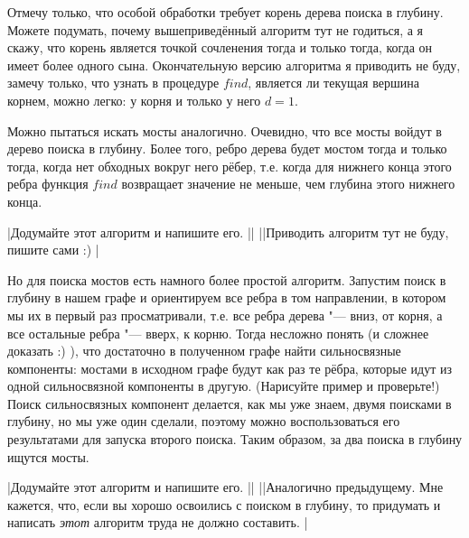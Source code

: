 Отмечу только, что особой обработки требует корень дерева поиска в глубину. Можете подумать, почему вышеприведённый 
алгоритм тут не годиться, а я скажу, что корень является точкой сочленения тогда и только тогда, когда он
имеет более одного сына. Окончательную версию алгоритма я приводить не буду, замечу только, что узнать в
процедуре $find$, является ли текущая вершина корнем, можно легко: у корня и только у него $d=1$.

 Можно пытаться искать мосты аналогично. Очевидно, что все мосты войдут в дерево поиска в глубину.
Более того, ребро дерева будет мостом тогда и только тогда, когда нет обходных вокруг него рёбер, т.е. когда для
нижнего конца этого ребра функция $find$ возвращает значение не меньше, чем глубина этого нижнего конца.

\task|Додумайте этот алгоритм и напишите его.
||
||Приводить алгоритм тут не буду, пишите сами :)
|\label{bridgesstupid}

Но для поиска мостов есть намного более простой алгоритм. Запустим поиск в глубину в нашем графе и ориентируем 
все ребра в том направлении, в котором мы их в первый раз просматривали, т.е. все ребра дерева "---
вниз, от корня, а все остальные ребра "--- вверх, к корню. Тогда несложно понять (и сложнее доказать :) ),
что достаточно в полученном графе найти сильносвязные компоненты: мостами в исходном графе будут как раз те рёбра,
которые идут из одной сильносвязной компоненты в другую. (Нарисуйте пример и проверьте!) Поиск сильносвязных компонент
делается, как мы уже знаем, двумя поисками в глубину, но мы уже один сделали, поэтому можно воспользоваться
его результатами для запуска второго поиска. Таким образом, за два поиска в глубину ищутся мосты.

\task|Додумайте этот алгоритм и напишите его.
||
||Аналогично предыдущему. Мне кажется, что, если вы хорошо освоились с поиском в глубину,
то придумать и написать \textit{этот} алгоритм труда не должно составить.
|\label{bridgesadv}